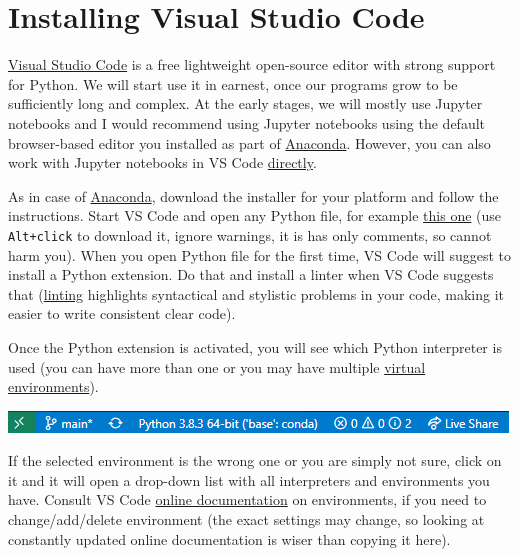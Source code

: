 \documentclass[
]{book}
\begin{document}
\hypertarget{install-vs-code}{%
\section*{Installing Visual Studio Code}\label{install-vs-code}}

\href{https://code.visualstudio.com/}{Visual Studio Code} is a free lightweight open-source editor with strong support for Python. We will start use it in earnest, once our programs grow to be sufficiently long and complex. At the early stages, we will mostly use Jupyter notebooks and I would recommend using Jupyter notebooks using the default browser-based editor you installed as part of \protect\hyperlink{install-anaconda}{Anaconda}. However, you can also work with Jupyter notebooks in VS Code \href{https://code.visualstudio.com/docs/python/jupyter-support}{directly}.

As in case of \protect\hyperlink{install-anaconda}{Anaconda}, download the installer for your platform and follow the instructions. Start VS Code and open any Python file, for example \href{other/empty.py}{this one} (use \texttt{Alt+click} to download it, ignore warnings, it is has only comments, so cannot harm you). When you open Python file for the first time, VS Code will suggest to install a Python extension. Do that and install a linter when VS Code suggests that (\href{https://code.visualstudio.com/docs/python/linting}{linting} highlights syntactical and stylistic problems in your code, making it easier to write consistent clear code).

Once the Python extension is activated, you will see which Python interpreter is used (you can have more than one or you may have multiple \href{https://docs.python.org/3/tutorial/venv.html}{virtual environments}).

\begin{center}\includegraphics[width=1\linewidth]{images/vscode-python-interpreter} \end{center}

If the selected environment is the wrong one or you are simply not sure, click on it and it will open a drop-down list with all interpreters and environments you have. Consult VS Code \href{https://code.visualstudio.com/docs/python/environments}{online documentation} on environments, if you need to change/add/delete environment (the exact settings may change, so looking at constantly updated online documentation is wiser than copying it here).
\end{document}
